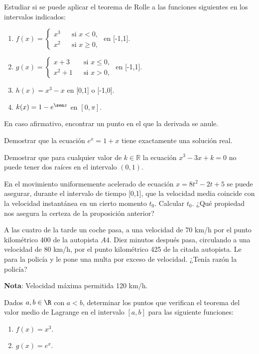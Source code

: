 
{Estudiar si se puede aplicar el teorema de Rolle a las funciones siguientes en los intervalos indicados:
\begin{enumerate}
    \item  $f(x)=\left\{
    \begin{array}{ccl}
        x^3 &  & \mbox{si } x<0,  \\
        x^2 &  & \mbox{si } x\geq 0,
    \end{array}\right.$
    \quad en [-1,1].

    \item  $g(x)=\left\{
    \begin{array}{ccl}
        x+3 &  & \mbox{si } x\leq 0,  \\
        x^2+1 &  & \mbox{si } x> 0,
    \end{array}\right.$
    \quad en [-1,1].

    \item  $h(x)=x^3-x$ \quad en [0,1] o [-1,0].

    \item  $k(x)=1-e^{\sen x}$ \quad  en $[0,\pi]$.
\end{enumerate}
En caso afirmativo, encontrar un punto en el que la derivada se anule.
}


{Demostrar que la ecuación $e^x=1+x$ tiene exactamente una solución real.
}


{Demostrar que para cualquier valor de $k\in \mathbb{R}$ la ecuación $x^3-3x+k=0$ no puede tener dos raíces en el intervalo $(0,1)$.
}


{En el movimiento uniformemente acelerado de ecuación $x=8t^2-2t+5$ se puede asegurar, durante el intervalo de tiempo [0,1], que la velocidad media coincide con la velocidad instantánea en un cierto momento $t_{0}$. Calcular $t_{0}$. ¿Qué propiedad nos asegura la certeza de la proposición anterior?
}


{A las cuatro de la tarde un coche pasa, a una velocidad de 70 km/h por el punto kilométrico 400 de la autopista $A4$. Diez minutos después pasa, circulando a una velocidad de 80 km/h, por el punto kilométrico 425 de la citada autopista. Le para la policía y le pone una multa por exceso de velocidad. ¿Tenía razón la policía?

\noindent  \textbf{Nota}: Velocidad máxima permitida 120 km/h.
}


{Dados $a,b \in \R$ con $a<b$, determinar los puntos que verifican el teorema del valor medio de Lagrange en el intervalo $[a,b]$ para las siguiente funciones:
\begin{multicols}{2}
\begin{enumerate}
    \item  $f(x)=x^3$.

    \item  $g(x)=e^x$.
\end{enumerate}
\end{multicols}
}
